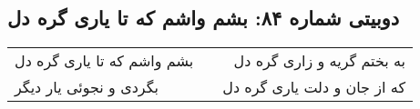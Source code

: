 \begin{center}
\section*{دوبیتی شماره ۸۴: بشم واشم که تا یاری گره دل}
\label{sec:084}
\begin{longtable}{l p{0.5cm} r}
بشم واشم که تا یاری گره دل
&&
به بختم گریه و زاری گره دل
\\
بگردی و نجوئی یار دیگر
&&
که از جان و دلت یاری گره دل
\\
\end{longtable}
\end{center}
